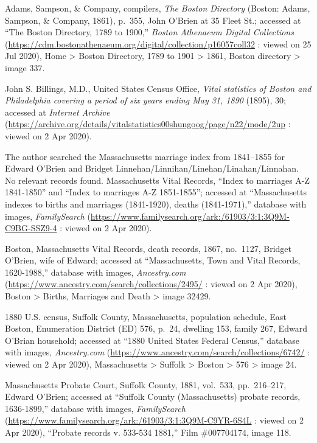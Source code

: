 \begin{thebibliography}{999}
	Adams, Sampson, \& Company, compilers, \textit{The Boston Directory} (Boston: Adams, Sampson, \& Company, 1861), p.\ 355, John O'Brien at 35 Fleet St.; accessed at ``The Boston Directory, 1789 to 1900,'' \textit{Boston Athenaeum Digital Collections} (\url{https://cdm.bostonathenaeum.org/digital/collection/p16057coll32} : viewed on 25 Jul 2020), Home > Boston Directory, 1789 to 1901 > 1861, Boston directory > image 337.
	
	John S. Billings, M.D., United States Census Office, \textit{Vital statistics of Boston and Philadelphia covering a period of six years ending May 31, 1890} (1895), 30; accessed at \textit{Internet Archive} (\url{https://archive.org/details/vitalstatistics00shungoog/page/n22/mode/2up} : viewed on 2 Apr 2020). 
	
	The author searched the Massachusetts marriage index from 1841--1855 for Edward O'Brien and Bridget Linnehan/Linnihan/Linehan/Linahan/Linnahan. No relevant records found.	
	Massachusetts Vital Records, ``Index to marriages A-Z 1841-1850'' and ``Index to marriages A-Z 1851-1855''; accessed at ``Massachusetts indexes to births and marriages (1841-1920), deaths (1841-1971),'' database with images, \textit{FamilySearch} (\url{https://www.familysearch.org/ark:/61903/3:1:3Q9M-C9BG-SSZ9-4} : viewed on 2 Apr 2020).
	
	Boston, Massachusetts Vital Records, death records, 1867, no.\ 1127, Bridget O'Brien, wife of Edward; accessed at ``Massachusetts, Town and Vital Records, 1620-1988,'' database with images, \textit{Ancestry.com} (\url{https://www.ancestry.com/search/collections/2495/} : viewed on 2 Apr 2020), Boston > Births, Marriages and Death > image 32429.
	
	1880 U.S. census, Suffolk County, Massachusetts, population schedule, East Boston, Enumeration District (ED) 576, p.\ 24, dwelling 153, family 267, Edward O'Brian household; accessed at ``1880 United States Federal Census,'' database with images, \textit{Ancestry.com} (\url{https://www.ancestry.com/search/collections/6742/} : viewed on 2 Apr 2020), Massachusetts > Suffolk > Boston > 576 > image 24.
	
	Massachusetts Probate Court, Suffolk County, 1881, vol.\ 533, pp.\ 216--217, Edward O'Brien; accessed at ``Suffolk County (Massachusetts) probate records, 1636-1899,'' database with images, \textit{FamilySearch} (\url{https://www.familysearch.org/ark:/61903/3:1:3Q9M-C9YR-6S4L} : viewed on 2 Apr 2020), ``Probate records v. 533-534 1881,'' Film \#007704174, image 118.
	

\end{thebibliography}

